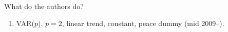 \documentclass[10pt,english,slidetop,compress,
              blue,mathserif,color=option]{beamer}
\theoremstyle{plain}
\theoremstyle{definition}
\begin{document}
\begin{frame}{What do the authors do?}
  \begin{enumerate}
    \item VAR($p$), $p=2$, linear trend, constant, peace dummy (mid 2009--).
    

\end{enumerate}
\end{frame}
\end{document}

